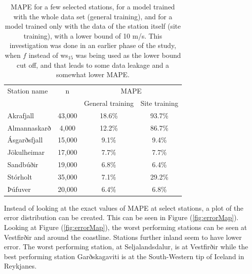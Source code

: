 \begin{table}[h]
  \caption[Model result by station]{MAPE for a few selected stations, for a model trained with the whole data set (general training), and for a model trained only with the data of the station itself (site training), with a lower bound of 10 m/s. This investigation was done in an earlier phase of the study, when $f$ instead of ws$_{15}$ was being used as the lower bound cut off, and that leads to some data leakage and a somewhat lower MAPE.}
    \label{table:specific_sites}
    \centering
    \begin{tabular}{lccc}
        \toprule
        Station name & n & \multicolumn{2}{c}{MAPE}\\
        & & General training & Site training\\
        \midrule
        Akrafjall & 43,000 & 18.6\% & 93.7\%\\
        Almannaskarð & 4,000 & 12.2\% & 86.7\%\\
        Ásgarðsfjall & 15,000 & 9.1\% & 9.4\%\\
        Jökulheimar & 17,000 & 7.7\% & 7.7\%\\
        Sandbúðir & 19,000 & 6.8\% & 6.4\%\\
        Stórholt & 35,000 & 7.1\% & 29.2\% \\
        Þúfuver & 20,000 & 6.4\% & 6.8\%\\
        \bottomrule
    \end{tabular}
\end{table}


Instead of looking at the exact values of MAPE at select stations, a plot of the error distribution can be created. This can be seen in Figure (\ref{fig:errorMap}). Looking at Figure (\ref{fig:errorMap}), the worst performing stations can be seen at Vestfirðir and around the coastline. Stations further inland seem to have lower error. The worst performing station, at Seljalandsdalur, is at Vestfirðir while the best performing station Garðskagaviti is at the South-Western tip of Iceland in Reykjanes.

